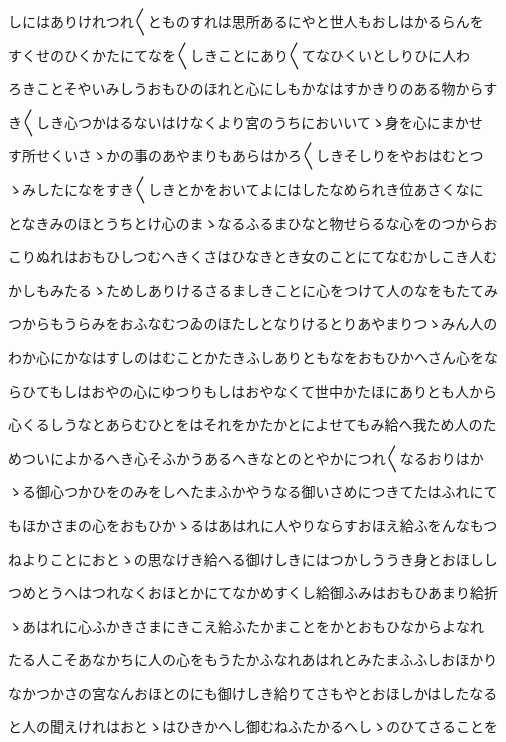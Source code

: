 \documentclass[a4paper,11pt,landscape]{ltjtarticle}
\begin{document}
しにはありけれつれ〱とものすれは思所あるにやと世人もおしはかるらんを
\par\medskip
すくせのひくかたにてなを〱しきことにあり〱てなひくいとしりひに人わ
\par\medskip
ろきことそやいみしうおもひのほれと心にしもかなはすかきりのある物からす
\par\medskip
き〱しき心つかはるないはけなくより宮のうちにおいいてゝ身を心にまかせ
\par\medskip
す所せくいさゝかの事のあやまりもあらはかろ〱しきそしりをやおはむとつ
\par\medskip
ゝみしたになをすき〱しきとかをおいてよにはしたなめられき位あさくなに
\par\medskip
となきみのほとうちとけ心のまゝなるふるまひなと物せらるな心をのつからお
\par\medskip
こりぬれはおもひしつむへきくさはひなきとき女のことにてなむかしこき人む
\par\medskip
かしもみたるゝためしありけるさるましきことに心をつけて人のなをもたてみ
\par\medskip
つからもうらみをおふなむつゐのほたしとなりけるとりあやまりつゝみん人の
\par\medskip
わか心にかなはすしのはむことかたきふしありともなをおもひかへさん心をな
\par\medskip
らひてもしはおやの心にゆつりもしはおやなくて世中かたほにありとも人から
\par\medskip
心くるしうなとあらむひとをはそれをかたかとによせてもみ給へ我ため人のた
\par\medskip
めついによかるへき心そふかうあるへきなとのとやかにつれ〱なるおりはか
\par\medskip
ゝる御心つかひをのみをしへたまふかやうなる御いさめにつきてたはふれにて
\par\medskip
もほかさまの心をおもひかゝるはあはれに人やりならすおほえ給ふをんなもつ
\par\medskip
ねよりことにおとゝの思なけき給へる御けしきにはつかしううき身とおほしし
\par\medskip
つめとうへはつれなくおほとかにてなかめすくし給御ふみはおもひあまり給折
\par\medskip
ゝあはれに心ふかきさまにきこえ給ふたかまことをかとおもひなからよなれ
\par\medskip
たる人こそあなかちに人の心をもうたかふなれあはれとみたまふふしおほかり
\par\medskip
なかつかさの宮なんおほとのにも御けしき給りてさもやとおほしかはしたなる
\par\medskip
と人の聞えけれはおとゝはひきかへし御むねふたかるへしゝのひてさることを
\end{document}
